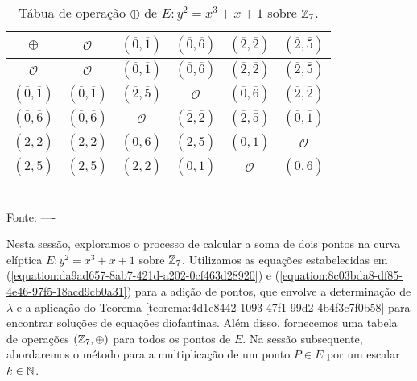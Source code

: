 \begin{table}[h!]\centering
	\caption{Tábua de operação $ \oplus$  de $E :  y^2 = x^3 + x + 1$ sobre $ \mathbb{Z}_{7} $.} \label{table:9a777247-111c-46c2-bd75-34f49e963e3e}
	\begin{tabular}{|c|c|c|c|c|c|}
		\hline
		$\oplus$                        & $\mathcal{O}$                   & $(\overline{0},\overline{1})$   & $(\overline{0},\overline{6}) $  & $ (\overline{2},\overline{2})$  & $(\overline{2},\overline{5})$   \\

		\hline
		$\mathcal{O}$                   & $\mathcal{O}$                   & $ (\overline{0},\overline{1})$  & $ (\overline{0},\overline{6}) $ & $ (\overline{2},\overline{2}) $ & $(\overline{2},\overline{5}) $  \\
		\hline
		$(\overline{0},\overline{1}) $  & $ (\overline{0},\overline{1}) $ & $ (\overline{2},\overline{5}) $ & $\mathcal{O}$                   & $(\overline{0},\overline{6})$   & $(\overline{2},\overline{2}) $  \\
		\hline
		$(\overline{0},\overline{6}) $  & $(\overline{0},\overline{6})$   & $\mathcal{O}$                   & $ (\overline{2},\overline{2}) $ & $(\overline{2},\overline{5})$   & $ (\overline{0},\overline{1}) $ \\
		\hline
		$(\overline{2},\overline{2}) $  & $ (\overline{2},\overline{2})$  & $(\overline{0},\overline{6}) $  & $ (\overline{2},\overline{5}) $ & $(\overline{0},\overline{1}) $  & $\mathcal{O}$                   \\
		\hline
		$	(\overline{2},\overline{5}) $ & $ (\overline{2},\overline{5}) $ & $(\overline{2},\overline{2}) $  & $(\overline{0},\overline{1}) $  & $\mathcal{O}$                   & $ (\overline{0},\overline{6}) $ \\
		\hline
	\end{tabular}
	\vspace*{0.4cm}\\ %
	Fonte:  ----
\end{table}

Nesta sessão, exploramos o processo de calcular a soma de dois pontos na curva
elíptica $E : y^2 = x^3 + x + 1$ sobre $\mathbb{Z}_{7}$. Utilizamos as equações
estabelecidas em (\ref{equation:da9ad657-8ab7-421d-a202-0cf463d28920}) e
(\ref{equation:8c03bda8-df85-4e46-97f5-18acd9cb0a31}) para a adição de pontos,
que envolve a determinação de $\lambda$ e a aplicação do Teorema
\ref{teorema:4d1e8442-1093-47f1-99d2-4b4f3c7f0b58} para encontrar soluções de
equações diofantinas. Além disso, fornecemos uma tabela de operações $(\mathbb{Z}_7,
	\oplus)$ para todos os pontos de $E$. Na sessão subsequente, abordaremos o
método para a multiplicação de um ponto $P \in E$ por um escalar $k \in \mathbb{N}$.

